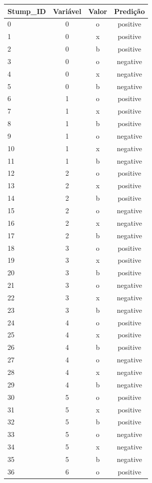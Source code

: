 \begin{table}[h]
\centering
\begin{tabular}{lccc}
\textbf{Stump\_ID} & \textbf{Variável} & \textbf{Valor} & \textbf{Predição} \\ \hline
0 & 0 & o & positive \\
1 & 0 & x & positive \\
2 & 0 & b & positive \\
3 & 0 & o & negative \\
4 & 0 & x & negative \\
5 & 0 & b & negative \\
6 & 1 & o & positive \\
7 & 1 & x & positive \\
8 & 1 & b & positive \\
9 & 1 & o & negative \\
10 & 1 & x & negative \\
11 & 1 & b & negative \\
12 & 2 & o & positive \\
13 & 2 & x & positive \\
14 & 2 & b & positive \\
15 & 2 & o & negative \\
16 & 2 & x & negative \\
17 & 2 & b & negative \\
18 & 3 & o & positive \\
19 & 3 & x & positive \\
20 & 3 & b & positive \\
21 & 3 & o & negative \\
22 & 3 & x & negative \\
23 & 3 & b & negative \\
24 & 4 & o & positive \\
25 & 4 & x & positive \\
26 & 4 & b & positive \\
27 & 4 & o & negative \\
28 & 4 & x & negative \\
29 & 4 & b & negative \\
30 & 5 & o & positive \\
31 & 5 & x & positive \\
32 & 5 & b & positive \\
33 & 5 & o & negative \\
34 & 5 & x & negative \\
35 & 5 & b & negative \\
36 & 6 & o & positive \\

\end{tabular}
\end{table}
